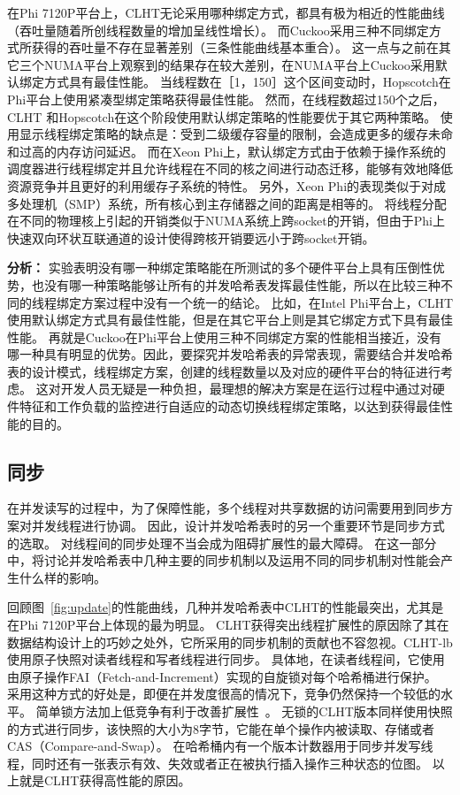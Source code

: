 在Phi 7120P平台上，CLHT无论采用哪种绑定方式，都具有极为相近的性能曲线（吞吐量随着所创线程数量的增加呈线性增长）。
而Cuckoo采用三种不同绑定方式所获得的吞吐量不存在显著差别（三条性能曲线基本重合）。
这一点与之前在其它三个NUMA平台上观察到的结果存在较大差别，在NUMA平台上Cuckoo采用默认绑定方式具有最佳性能。
当线程数在［1，150］这个区间变动时，Hopscotch在Phi平台上使用紧凑型绑定策略获得最佳性能。
然而，在线程数超过150个之后，CLHT 和Hopscotch在这个阶段使用默认绑定策略的性能要优于其它两种策略。
使用显示线程绑定策略的缺点是：受到二级缓存容量的限制，会造成更多的缓存未命和过高的内存访问延迟。
而在Xeon Phi上，默认绑定方式由于依赖于操作系统的调度器进行线程绑定并且允许线程在不同的核之间进行动态迁移，能够有效地降低资源竞争并且更好的利用缓存子系统的特性。
另外，Xeon Phi的表现类似于对成多处理机（SMP）系统，所有核心到主存储器之间的距离是相等的。
将线程分配在不同的物理核上引起的开销类似于NUMA系统上跨socket的开销，但由于Phi上快速双向环状互联通道的设计使得跨核开销要远小于跨socket开销。

\textbf{分析：} 实验表明没有哪一种绑定策略能在所测试的多个硬件平台上具有压倒性优势，也没有哪一种策略能够让所有的并发哈希表发挥最佳性能，所以在比较三种不同的线程绑定方案过程中没有一个统一的结论。
比如，在Intel Phi平台上，CLHT使用默认绑定方式具有最佳性能，但是在其它平台上则是其它绑定方式下具有最佳性能。
再就是Cuckoo在Phi平台上使用三种不同绑定方案的性能相当接近，没有哪一种具有明显的优势。因此，要探究并发哈希表的异常表现，需要结合并发哈希表的设计模式，线程绑定方案，创建的线程数量以及对应的硬件平台的特征进行考虑。
这对开发人员无疑是一种负担，最理想的解决方案是在运行过程中通过对硬件特征和工作负载的监控进行自适应的动态切换线程绑定策略，以达到获得最佳性能的目的。

\subsection{同步}
\label{sec:sync}
在并发读写的过程中，为了保障性能，多个线程对共享数据的访问需要用到同步方案对并发线程进行协调。
因此，设计并发哈希表时的另一个重要环节是同步方式的选取。
对线程间的同步处理不当会成为阻碍扩展性的最大障碍。
在这一部分中，将讨论并发哈希表中几种主要的同步机制以及运用不同的同步机制对性能会产生什么样的影响。

回顾图~\ref{fig:update}的性能曲线，几种并发哈希表中CLHT的性能最突出，尤其是在Phi 7120P平台上体现的最为明显。
CLHT获得突出线程扩展性的原因除了其在数据结构设计上的巧妙之处外，它所采用的同步机制的贡献也不容忽视。CLHT-lb使用原子快照对读者线程和写者线程进行同步。
具体地，在读者线程间，它使用由原子操作FAI（Fetch-and-Increment）实现的自旋锁对每个哈希桶进行保护。
采用这种方式的好处是，即便在并发度很高的情况下，竞争仍然保持一个较低的水平。
简单锁方法加上低竞争有利于改善扩展性~\cite{david}。
无锁的CLHT版本同样使用快照的方式进行同步，该快照的大小为8字节，它能在单个操作内被读取、存储或者CAS（Compare-and-Swap）。
在哈希桶内有一个版本计数器用于同步并发写线程，同时还有一张表示有效、失效或者正在被执行插入操作三种状态的位图。
以上就是CLHT获得高性能的原因。

